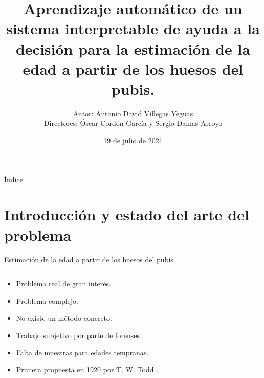 \documentclass{beamer}
\title{Aprendizaje automático de un sistema interpretable de ayuda a la decisión para la estimación de la edad a partir de los huesos del pubis.}
\date{19 de julio de 2021}
\author{\small Autor: Antonio David Villegas Yeguas \\ Directores: Óscar Cordón García y Sergio Damas Arroyo}
\institute[UGR]{Universidad de Granada\\
\medskip
\textit{advy99@correo.ugr.es}\\
\medskip
\url{https://github.com/advy99/TFG}
\doclicenseThis
}
\begin{document}
 \maketitle

\begin{frame}{Índice}
\tableofcontents
\end{frame}




\section{Introducción y estado del arte del problema}
\begin{frame}{Estimación de la edad a partir de los huesos del pubis}

	\begin{columns}[T]
		\begin{column}{.4\textwidth}
			\begin{itemize}
				\item Problema real de gran interés.
				\item Problema complejo.
				\item No existe un método concreto.
				\item Trabajo subjetivo por parte de forenses.
				\item Falta de muestras para edades tempranas.
				\item Primera propuesta en 1920 por T. W. Todd \cite{todd}.
			\end{itemize}

		\end{column}


\end{columns}
\end{frame}
\end{document}
